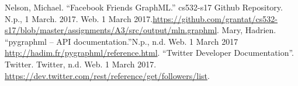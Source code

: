 \documentclass[letterpaper,11pt]{article}
\begin{document}

\begin{thebibliography}{9}
Nelson, Michael. ``Facebook Friends GraphML.'' cs532-s17 Github Repository. N.p., 1 March. 2017. Web. 1 March 2017.\url{https://github.com/grantat/cs532-s17/blob/master/assignments/A3/src/output/mln.graphml}.
Mary, Hadrien. ``pygraphml – API documentation.''N.p., n.d. Web. 1 March 2017 \url{http://hadim.fr/pygraphml/reference.html}.
``Twitter Developer Documentation''. Twitter. Twitter, n.d. Web. 1 March 2017. \url{https://dev.twitter.com/rest/reference/get/followers/list}.
\end{thebibliography}
\end{document}
